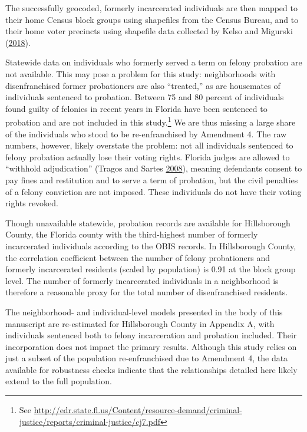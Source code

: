 \documentclass[
  12pt,
]{article}
\begin{document}
The successfully geocoded, formerly incarcerated individuals are then mapped to their home Census block groups using shapefiles from the Census Bureau, and to their home voter precincts using shapefile data collected by Kelso and Migurski (\protect\hyperlink{ref-Kelso2018}{2018}).

Statewide data on individuals who formerly served a term on felony probation are not available. This may pose a problem for this study: neighborhoods with disenfranchised former probationers are also ``treated,'' as are housemates of individuals sentenced to probation. Between 75 and 80 percent of individuals found guilty of felonies in recent years in Florida have been sentenced to probation and are not included in this study.\footnote{See \url{http://edr.state.fl.us/Content/resource-demand/criminal-justice/reports/criminal-justice/cj7.pdf}} We are thus missing a large share of the individuals who stood to be re-enfranchised by Amendment 4. The raw numbers, however, likely overstate the problem: not all individuals sentenced to felony probation actually lose their voting rights. Florida judges are allowed to ``withhold adjudication'' (Tragos and Sartes \protect\hyperlink{ref-Tragos2008}{2008}), meaning defendants consent to pay fines and restitution and to serve a term of probation, but the civil penalties of a felony conviction are not imposed. These individuals do not have their voting rights revoked.

Though unavailable statewide, probation records are available for Hillsborough County, the Florida county with the third-highest number of formerly incarcerated individuals according to the OBIS records. In Hillsborough County, the correlation coefficient between the number of felony probationers and formerly incarcerated residents (scaled by population) is 0.91 at the block group level. The number of formerly incarcerated individuals in a neighborhood is therefore a reasonable proxy for the total number of disenfranchised residents.

The neighborhood- and individual-level models presented in the body of this manuscript are re-estimated for Hillsborough County in Appendix A, with individuals sentenced both to felony incarceration and probation included. Their incorporation does not impact the primary results. Although this study relies on just a subset of the population re-enfranchised due to Amendment 4, the data available for robustness checks indicate that the relationships detailed here likely extend to the full population.
\end{document}
